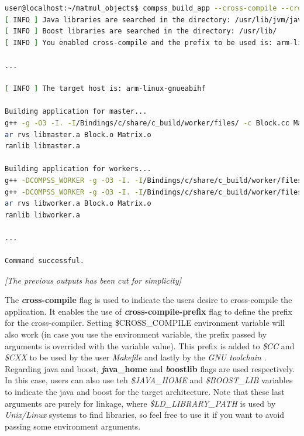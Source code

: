 \begin{lstlisting}[language=bash]
user@localhost:~/matmul_objects$ compss_build_app --cross-compile --cross-compile-prefix=arm-linux-gnueabihf- --java_home=/usr/lib/jvm/java-1.8.0-openjdk-armhf Matmul
[ INFO ] Java libraries are searched in the directory: /usr/lib/jvm/java-1.8.0-openjdk-armhf/jre/lib/arm/server
[ INFO ] Boost libraries are searched in the directory: /usr/lib/
[ INFO ] You enabled cross-compile and the prefix to be used is: arm-linux-gnueabihf-

...

[ INFO ] The target host is: arm-linux-gnueabihf

Building application for master...
g++ -g -O3 -I. -I/Bindings/c/share/c_build/worker/files/ -c Block.cc Matrix.cc 
ar rvs libmaster.a Block.o Matrix.o
ranlib libmaster.a

Building application for workers...
g++ -DCOMPSS_WORKER -g -O3 -I. -I/Bindings/c/share/c_build/worker/files/ -c Block.cc -o Block.o
g++ -DCOMPSS_WORKER -g -O3 -I. -I/Bindings/c/share/c_build/worker/files/ -c Matrix.cc -o Matrix.o
ar rvs libworker.a Block.o Matrix.o 
ranlib libworker.a

... 

Command successful.

\end{lstlisting}

\emph{[The previous outputs has been cut for simplicity]}

The {\textbf {\textit cross-compile}} flag is used to indicate the users desire to cross-compile the application. It enables the use of {\textbf{\textit cross-compile-prefix}} flag to define the prefix for the cross-compiler. Setting {\$CROSS\_COMPILE} environment variable will also work (in case you use the environment variable, the prefix passed by arguments is overrided with the variable value). This prefix is added to {\it \$CC} and {\it \$CXX} to be used by the user {\it Makefile} and lastly by the {\it GNU toolchain} . Regarding java and boost, {\textbf{\textit java\_home}} and {\textbf{\textit boostlib}} flags are used respectively. In this case, users can also use teh {\it \$JAVA\_HOME} and {\it \$BOOST\_LIB} variables to indicate the java and boost for the target architecture. Note that these last arguments are purely for linkage, where {\it \$LD\_LIBRARY\_PATH} is used by {\it Unix/Linux} systems to find libraries, so feel free to use it if you want to avoid passing some environment arguments.
\newline 


